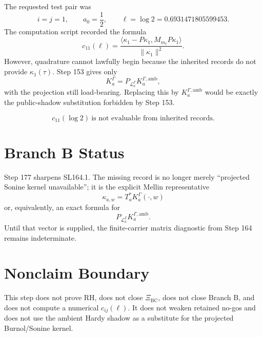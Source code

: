 \documentclass[11pt]{article}
\begin{document}
The requested test pair was
\[
i=j=1,\qquad a_0=\frac12,\qquad
\ell=\log 2=0.6931471805599453.
\]
The computation script recorded the formula
\[
c_{11}(\ell)
=
\frac{\langle \kappa_1-P\kappa_1,M_{m_\ell}P\kappa_1\rangle}
{\|\kappa_1\|^2}.
\]
However, quadrature cannot lawfully begin because the inherited records do not
provide \(\kappa_1(\tau)\).  Step 153 gives only
\[
K_a^\Gamma=P_{\mathcal L_a^\Gamma}K_a^{\Gamma,\mathrm{amb}},
\]
with the projection still load-bearing.  Replacing this by
\(K_a^{\Gamma,\mathrm{amb}}\) would be exactly the public-shadow substitution
forbidden by Step 153.

\[
\boxed{
c_{11}(\log2)\ \text{is not evaluable from inherited records.}
}
\]

\section{Branch B Status}

Step 177 sharpens SL164.1.  The missing record is no longer merely
``projected Sonine kernel unavailable''; it is the explicit Mellin
representative
\[
\kappa_{a,w}=T_a^*K_a^\Gamma(\cdot,w)
\]
or, equivalently, an exact formula for
\[
P_{\mathcal L_a^\Gamma}K_a^{\Gamma,\mathrm{amb}}.
\]
Until that vector is supplied, the finite-carrier matrix diagnostic from Step
164 remains indeterminate.

\section{Nonclaim Boundary}

This step does not prove RH, does not close \(\Xi_{\mathrm{BC}}\), does not
close Branch B, and does not compute a numerical \(c_{ij}(\ell)\).  It does
not weaken retained no-gos and does not use the ambient Hardy shadow as a
substitute for the projected Burnol/Sonine kernel.
\end{document}
